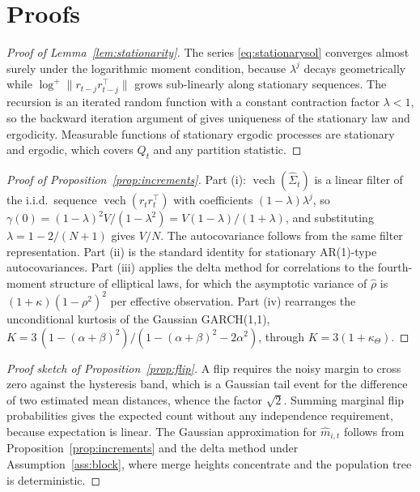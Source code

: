 \documentclass{rQUF2e}
\theoremstyle{plain}
\theoremstyle{remark}
\newcommand{\vech}{\operatorname{vech}}
\begin{document}



\appendices
\section{Proofs}
\label{app:proofs}


\begin{proof}[Proof of Lemma~\ref{lem:stationarity}]
The series \eqref{eq:stationarysol} converges almost surely under the
logarithmic moment condition, because $\lambda^j$ decays geometrically while
$\log^{+}\|r_{t-j} r_{t-j}^{\top}\|$ grows sub-linearly along stationary
sequences. The recursion is an iterated random function with a constant
contraction factor $\lambda < 1$, so the backward iteration argument of
\citet{diaconis1999iterated} gives uniqueness of the stationary law and
ergodicity. Measurable functions of stationary ergodic processes are stationary
and ergodic, which covers $Q_t$ and any partition statistic.
\end{proof}

\begin{proof}[Proof of Proposition~\ref{prop:increments}]
Part (i): $\vech(\widehat{\Sigma}_t)$ is a linear filter of the i.i.d.\
sequence $\vech(r_t r_t^{\top})$ with coefficients $(1-\lambda)\lambda^{j}$, so
$\gamma(0) = (1-\lambda)^2 V / (1-\lambda^2) = V(1-\lambda)/(1+\lambda)$, and
substituting $\lambda = 1 - 2/(N+1)$ gives $V/N$. The autocovariance follows
from the same filter representation. Part (ii) is the standard identity for
stationary AR(1)-type autocovariances. Part (iii) applies the delta method for
correlations to the fourth-moment structure of elliptical laws, for which the
asymptotic variance of $\widehat{\rho}$ is $(1+\kappa)(1-\rho^2)^2$ per
effective observation. Part (iv) rearranges the unconditional kurtosis of the
Gaussian GARCH(1,1), $K = 3\,(1-(\alpha+\beta)^2)/(1-(\alpha+\beta)^2-2\alpha^2)$,
through $K = 3(1+\kappa_{\Theta})$.
\end{proof}

\begin{proof}[Proof sketch of Proposition~\ref{prop:flip}]
A flip requires the noisy margin to cross zero against the hysteresis band,
which is a Gaussian tail event for the difference of two estimated mean
distances, whence the factor $\sqrt{2}$. Summing marginal flip probabilities
gives the expected count without any independence requirement, because
expectation is linear. The Gaussian approximation for $\widehat{m}_{i,t}$
follows from Proposition~\ref{prop:increments} and the delta method under
Assumption~\ref{ass:block}, where merge heights concentrate and the population
tree is deterministic.
\end{proof}
\end{document}

